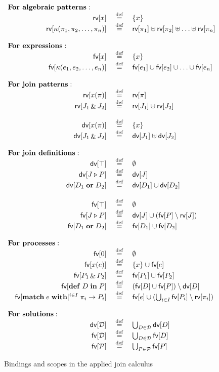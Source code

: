 \documentclass{LMCS}
\renewcommand{\exp}{e}
\newcommand{\const}{\kappa}
\newcommand{\kwd}[1]{\ensuremath{\mathbf{#1}}}
\newcommand{\prefix}[1]{\mathopen{}\mathrel{\kwd {#1}}}
\newcommand{\infix}[1]{\mathrel{\kwd {#1}}}
\newcommand{\set}[1]{\{#1\}}
\renewcommand{\_}{\mathord{\rule[-.25ex]{1ex}{.15ex}}}
\newcommand{\appnv}[4]{{#1}(#2, #3, \ldots{} , #4)}
\newcommand{\nullp}{0}
\newcommand{\defineas}{\;\stackrel{\mathrm{def}}=\;}
\newcommand{\para}[2]{#1\mathop{\&}#2}
\newcommand{\dis}[2]{#1\infix{or}#2}
\newcommand{\define}[2]{\prefix{def} #1 \infix{in} #2}
\newcommand{\matchthree}[3]{\prefix{match} #1 \infix{with} \mid^{i
    \in I} #2_i \rightarrow #3_i}
\newcommand{\reaction}[2]{#1 \triangleright #2}
\newcommand{\dd}{\mathcal{D}}
\newcommand{\pp}{\mathcal{P}}
\newcommand{\fv}[1]{\mbox{\sf fv}[#1]}
\newcommand{\dv}[1]{\mbox{\sf dv}[#1]}
\newcommand{\rv}[1]{\mbox{\sf rv}[#1]}
\begin{document}
\begin{figure}[!p]
\centering
$$
\begin{array}{lrcl}
\multicolumn{4}{l}{\textbf{For algebraic patterns}:}\\
&\rv{x} & \defineas & \set{x} \\
&\rv{\appnv{\const}{\pi_1}{\pi_2}{\pi_n}} & \defineas 
&\rv{\pi_1} \uplus \rv{\pi_2} \uplus \ldots \uplus \rv{\pi_n}\\
\\
\multicolumn{4}{l}{\textbf{For expressions}:}\\
&\fv{x} & \defineas & \set{x} \\
&\fv{\appnv{\const}{\exp_1}{\exp_2}{\exp_n}} & \defineas 
&\fv{\exp_1} \cup \fv{\exp_2} \cup \ldots \cup \fv{\exp_n}\\
\\
\multicolumn{4}{l}{\textbf{For join patterns}:}\\
&\rv{x(\pi)} & \defineas & \rv{\pi}\\
&\rv{\para{J_1}{J_2}} & \defineas & \rv{J_1} \uplus \rv{J_2}\\
\\
&\dv{x(\pi)} & \defineas & \set{x}\\
&\dv{\para{J_1}{J_2}} & \defineas & \dv{J_1} \uplus \dv{J_2}\\
\\
\multicolumn{4}{l}{\textbf{For join definitions}:}\\
&\dv{\top} & \defineas & \emptyset\\
&\dv{\reaction{J}{P}} & \defineas & \dv{J}\\
&\dv{\dis{D_1}{D_2}} & \defineas & \dv{D_1} \cup \dv{D_2}\\
\\
&\fv{\top} & \defineas & \emptyset\\
&\fv{\reaction{J}{P}} & \defineas & \dv{J} \cup (\fv{P} \setminus \rv{J})\\
&\fv{\dis{D_1}{D_2}} & \defineas & \fv{D_1} \cup \fv{D_2}\\
\\
\multicolumn{4}{l}{\textbf{For processes}:}\\
&\fv{\nullp} & \defineas & \emptyset\\
&\fv{x(\exp)} & \defineas & \set{x} \cup \fv{\exp}\\
&\fv{\para{P_1}{P_2}} & \defineas & \fv{P_1} \cup \fv{P_2}\\
&\fv{\define{D}{P}} & \defineas & (\fv{D}\cup\fv{P}) \setminus \dv{D}\\
&\fv{\matchthree{e}{\pi}{P}} & \defineas & 
\fv{e} \cup (\bigcup_{i \in I} \fv{P_i} \setminus \rv{\pi_i}) \\
\\
\multicolumn{4}{l}{\textbf{For solutions}:}\\
&\dv{\dd} & \defineas & {\bigcup_{D \in \dd}\dv{D}}\\
&\fv{\dd} & \defineas & {\bigcup_{D \in \dd}\fv{D}} \\
&\fv{\pp} & \defineas & {\bigcup_{P \in \pp}\fv{P}}
\end{array}
$$
\caption{Bindings and scopes in the applied join
  calculus}\label{fig.scope}
\end{figure}
\end{document}

